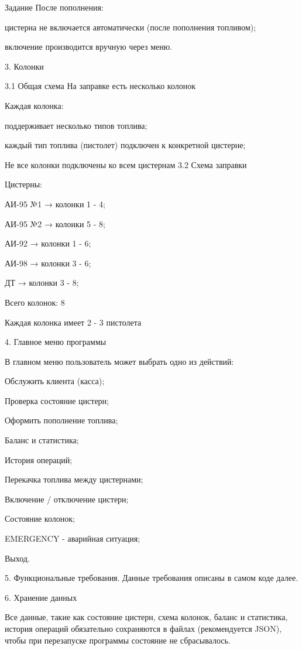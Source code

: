 \documentclass{vvsu}
\begin{document}
\begin{addition}{Задание}
  После пополнения:
\begin{vvsu_itemize}
  \item цистерна не включается автоматически (после пополнения топливом);
  \item включение производится вручную через меню.
\end{vvsu_itemize}

  3. Колонки

  3.1 Общая схема
  На заправке есть несколько колонок

  Каждая колонка:
\begin{vvsu_itemize}
  \item поддерживает несколько типов топлива;
  \item каждый тип топлива (пистолет) подключен к конкретной цистерне;
\end{vvsu_itemize}

  Не все колонки подключены ко всем цистернам
  3.2 Схема заправки

  Цистерны:
\begin{vvsu_itemize}
  \item АИ-95 №1 → колонки 1 - 4;
  \item АИ-95 №2 → колонки 5 - 8;
  \item АИ-92 → колонки 1 - 6;
  \item АИ-98 → колонки 3 - 6;
  \item ДТ → колонки 3 - 8;
\end{vvsu_itemize}

  Всего колонок: 8

  Каждая колонка имеет 2 - 3 пистолета

  4. Главное меню программы

  В главном меню пользователь может выбрать одно из действий:
\begin{vvsu_itemize}
  \item Обслужить клиента (касса);
  \item Проверка состояние цистерн;
  \item Оформить пополнение топлива;
  \item Баланс и статистика;
  \item История операций;
  \item Перекачка топлива между цистернами;
  \item Включение / отключение цистерн;
  \item Состояние колонок;
  \item EMERGENCY - аварийная ситуация;
  \item Выход.
\end{vvsu_itemize}

  5. Функциональные требования. Данные требования описаны в самом коде далее.

  6. Хранение данных

  Все данные, такие как состояние цистерн, схема колонок, баланс и статистика, история операций обязательно сохраняются в файлах (рекомендуется JSON), чтобы при перезапуске программы состояние не сбрасывалось.

\end{addition}
\end{document}
